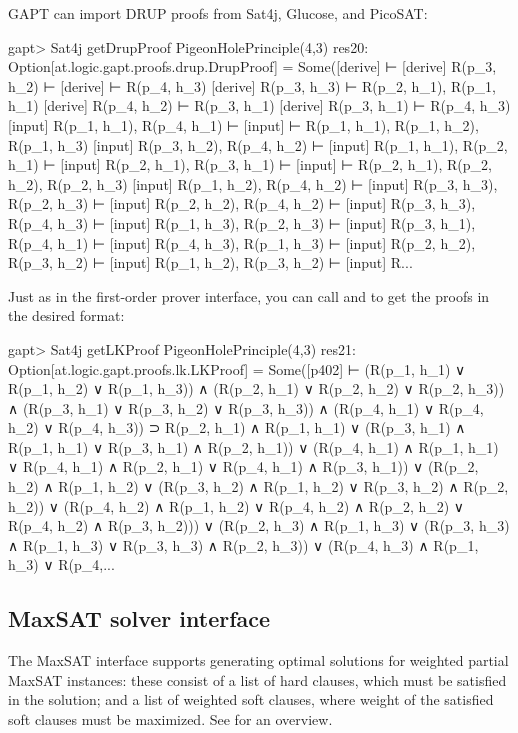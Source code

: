 \documentclass[a4paper,11pt]{article}
\newcommand{\cli}[1]{{\ttfamily {#1}}}
\begin{document}
GAPT can import DRUP proofs from Sat4j, Glucose, and PicoSAT:
\begin{clilisting}
gapt> Sat4j getDrupProof PigeonHolePrinciple(4,3)
res20: Option[at.logic.gapt.proofs.drup.DrupProof] =
Some([derive]  ⊢
[derive] R(p_3, h_2) ⊢
[derive]  ⊢ R(p_4, h_3)
[derive] R(p_3, h_3) ⊢ R(p_2, h_1), R(p_1, h_1)
[derive] R(p_4, h_2) ⊢ R(p_3, h_1)
[derive] R(p_3, h_1) ⊢ R(p_4, h_3)
[input] R(p_1, h_1), R(p_4, h_1) ⊢
[input]  ⊢ R(p_1, h_1), R(p_1, h_2), R(p_1, h_3)
[input] R(p_3, h_2), R(p_4, h_2) ⊢
[input] R(p_1, h_1), R(p_2, h_1) ⊢
[input] R(p_2, h_1), R(p_3, h_1) ⊢
[input]  ⊢ R(p_2, h_1), R(p_2, h_2), R(p_2, h_3)
[input] R(p_1, h_2), R(p_4, h_2) ⊢
[input] R(p_3, h_3), R(p_2, h_3) ⊢
[input] R(p_2, h_2), R(p_4, h_2) ⊢
[input] R(p_3, h_3), R(p_4, h_3) ⊢
[input] R(p_1, h_3), R(p_2, h_3) ⊢
[input] R(p_3, h_1), R(p_4, h_1) ⊢
[input] R(p_4, h_3), R(p_1, h_3) ⊢
[input] R(p_2, h_2), R(p_3, h_2) ⊢
[input] R(p_1, h_2), R(p_3, h_2) ⊢
[input] R...

\end{clilisting}

Just as in the first-order prover interface, you can call
\cli{getResolutionProof} and \cli{getLKProof} to get the proofs in the desired
format:
\begin{clilisting}
gapt> Sat4j getLKProof PigeonHolePrinciple(4,3)
res21: Option[at.logic.gapt.proofs.lk.LKProof] =
Some([p402]
⊢
(R(p_1, h_1) ∨ R(p_1, h_2) ∨ R(p_1, h_3)) ∧
    (R(p_2, h_1) ∨ R(p_2, h_2) ∨ R(p_2, h_3)) ∧
    (R(p_3, h_1) ∨ R(p_3, h_2) ∨ R(p_3, h_3)) ∧
    (R(p_4, h_1) ∨ R(p_4, h_2) ∨ R(p_4, h_3)) ⊃
  R(p_2, h_1) ∧ R(p_1, h_1) ∨
    (R(p_3, h_1) ∧ R(p_1, h_1) ∨ R(p_3, h_1) ∧ R(p_2, h_1)) ∨
    (R(p_4, h_1) ∧ R(p_1, h_1) ∨
      R(p_4, h_1) ∧ R(p_2, h_1) ∨
      R(p_4, h_1) ∧ R(p_3, h_1)) ∨
    (R(p_2, h_2) ∧ R(p_1, h_2) ∨
      (R(p_3, h_2) ∧ R(p_1, h_2) ∨ R(p_3, h_2) ∧ R(p_2, h_2)) ∨
      (R(p_4, h_2) ∧ R(p_1, h_2) ∨
        R(p_4, h_2) ∧ R(p_2, h_2) ∨
        R(p_4, h_2) ∧ R(p_3, h_2))) ∨
    (R(p_2, h_3) ∧ R(p_1, h_3) ∨
      (R(p_3, h_3) ∧ R(p_1, h_3) ∨ R(p_3, h_3) ∧ R(p_2, h_3)) ∨
      (R(p_4, h_3) ∧ R(p_1, h_3) ∨
        R(p_4,...

\end{clilisting}

\subsection{MaxSAT solver interface}

The MaxSAT interface supports generating optimal solutions for weighted partial
MaxSAT instances: these consist of a list of hard clauses, which must be
satisfied in the solution; and a list of weighted soft clauses, where weight of
the satisfied soft clauses must be maximized.  See \cite{Argelich2008First}
for an overview.
\end{document}
